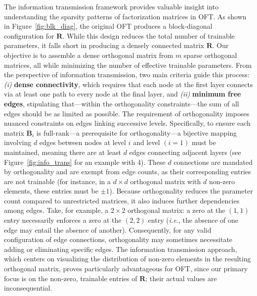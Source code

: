 The information transmission framework provides valuable insight into understanding the sparsity patterns of factorization matrices in OFT. As shown in Figure~\ref{fig:blk_diag}, the original OFT produces a block-diagonal configuration for $\bm{R}$. While this design reduces the total number of trainable parameters, it falls short in producing a densely connected matrix $\bm{R}$. Our objective is to assemble a dense orthogonal matrix from $m$ sparse orthogonal matrices, all while minimizing the number of effective trainable parameters. From the perspective of information transmission, two main criteria guide this process: \emph{(i)} \textbf{dense connectivity}, which requires that each node at the first layer connects via at least one path to every node at the final layer, and \emph{(ii)} \textbf{minimum free edges}, stipulating that—within the orthogonality constraints—the sum of all edges should be as limited as possible. The requirement of orthogonality imposes nuanced constraints on edges linking successive levels. Specifically, to ensure each matrix $\bm{B}_i$ is full-rank—a prerequisite for orthogonality—a bijective mapping involving $d$ edges between nodes at level $i$ and level $(i=1)$ must be maintained, meaning there are at least $d$ edges connecting adjacent layers (see Figure~\ref{fig:info_trans} for an example with 4). These $d$ connections are mandated by orthogonality and are exempt from edge counts, as their corresponding entries are not trainable (for instance, in a $d\times d$ orthogonal matrix with $d$ non-zero elements, these entries must be $\pm 1$). Because orthogonality reduces the parameter count compared to unrestricted matrices, it also induces further dependencies among edges. Take, for example, a $2\times 2$ orthogonal matrix: a zero at the $(1,1)$ entry necessarily enforces a zero at the $(2,2)$ entry (\emph{i.e.}, the absence of one edge may entail the absence of another). Consequently, for any valid configuration of edge connections, orthogonality may sometimes necessitate adding or eliminating specific edges. The information transmission approach, which centers on visualizing the distribution of non-zero elements in the resulting orthogonal matrix, proves particularly advantageous for OFT, since our primary focus is on the non-zero, trainable entries of $\bm{R}$; their actual values are inconsequential.

